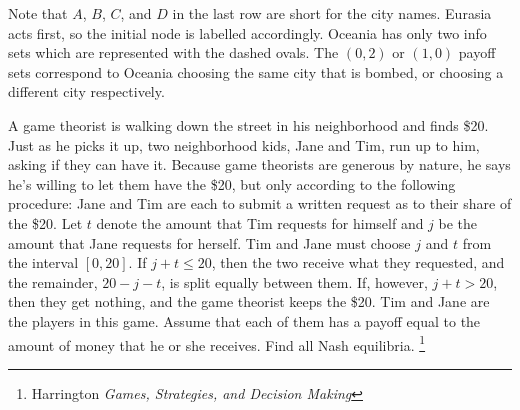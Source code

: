 \documentclass[addpoints ]{exam}
\begin{document}
\begin{questions}
\begin{solution}
  \begin{center}
     
  \end{center} 

  Note that $A$, $B$, $C$, and $D$ in the last row are short for the city names.
  Eurasia acts first, so the initial node is labelled accordingly.
  Oceania has only two info sets which are represented with the dashed ovals.
  The $(0,2)$ or $(1,0)$ payoff sets correspond to Oceania choosing the same city that is bombed,
  or choosing a different city respectively.
\end{solution}

\newpage

\question[10] 
A game theorist is walking down the street in his neighborhood and finds \$20.
Just as he picks it up, two neighborhood kids, 
Jane and Tim,
run up to him, asking if they can have it.
Because game theorists are generous by nature, 
he says he's willing to let them have the \$20,
but only according to the following procedure:
Jane and Tim are each to submit a written request 
as to their share of the \$20. 
Let $t$ denote the amount that Tim requests for himself
and $j$ be the amount that Jane requests for herself.
Tim and Jane must choose $j$ and $t$ from the interval
$[0,20]$.
If $j + t \leq 20$, then the two receive what they requested,
and the remainder, $20 - j - t$, is split equally between them.
If, however, $j + t > 20$, then they get nothing, and the game theorist keeps the \$20.
Tim and Jane are the players in this game.
Assume that each of them has a payoff equal to the amount of money that he or she receives. 
Find all Nash equilibria.
\footnote{Harrington \textit{Games, Strategies, and Decision Making}}


\newpage





\end{questions}
\end{document}
